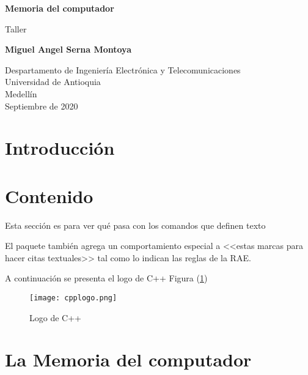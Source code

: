 \documentclass{article}
\begin{document}
\begin{titlepage}
    \begin{center}
        \vspace*{1cm}
            
        \Huge
        \textbf{Memoria del computador}
            
        \vspace{0.5cm}
        \LARGE
        Taller
            
        \vspace{1.5cm}
            
        \textbf{Miguel Angel Serna Montoya}
            
        \vfill
            
        \vspace{0.8cm}
            
        \Large
        Despartamento de Ingeniería Electrónica y Telecomunicaciones\\
        Universidad de Antioquia\\
        Medellín\\
        Septiembre de 2020
            
    \end{center}
\end{titlepage}

\tableofcontents

\section{Introducción} \label{Introducción}


\section{Contenido} \label{Contenido}

Esta sección es para ver qué pasa con los comandos 
que definen texto

El paquete también agrega un comportamiento especial 
a <<estas marcas para hacer citas textuales>> tal como 
lo indican las reglas de la RAE. \cite{dirac}



A continuación se presenta el logo de C++ Figura (\ref{fig:cpplogo})

\begin{figure}[h]
\texttt{[image: cpplogo.png]}
\centering
\caption{Logo de C++}
\label{fig:cpplogo}
\end{figure}
\section{La Memoria del computador}
\end{document}
